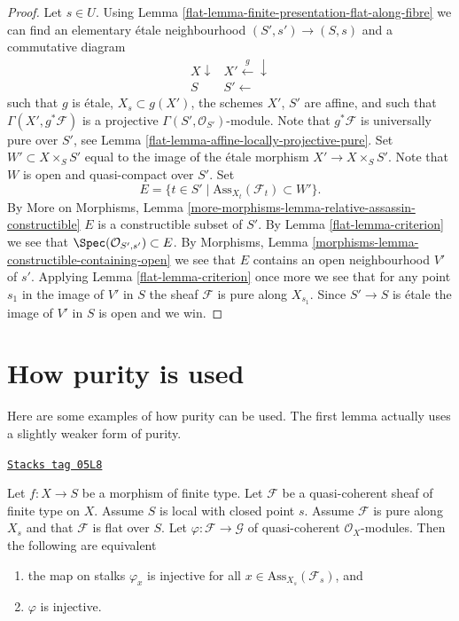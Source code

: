 \begin{proof}

Let $s \in U$. Using
Lemma \ref{flat-lemma-finite-presentation-flat-along-fibre}
we can find an elementary \'etale neighbourhood
$(S', s') \to (S, s)$ and a commutative diagram
$$
\begin{array}{cc}X \downarrow & X' \overset{g}{\longleftarrow}\downarrow \\ S & S' \longleftarrow\end{array}
$$
such that $g$ is \'etale, $X_s \subset g(X')$, the schemes
$X'$, $S'$ are affine, and such that $\Gamma(X', g^*\mathcal{F})$
is a projective $\Gamma(S', \mathcal{O}_{S'})$-module.
Note that $g^*\mathcal{F}$ is universally pure over $S'$, see
Lemma \ref{flat-lemma-affine-locally-projective-pure}.
Set $W' \subset X \times_S S'$ equal to the image of the \'etale morphism
$X' \to X \times_S S'$. Note that $W$ is open and quasi-compact over
$S'$. Set
$$
E = \{t \in S' \mid \text{Ass}_{X_t}(\mathcal{F}_t) \subset W' \}.
$$
By
More on Morphisms,
Lemma \ref{more-morphisms-lemma-relative-assassin-constructible}
$E$ is a constructible subset of $S'$. By
Lemma \ref{flat-lemma-criterion}
we see that $\Spec(\mathcal{O}_{S', s'}) \subset E$.
By
Morphisms, Lemma \ref{morphisms-lemma-constructible-containing-open}
we see that $E$ contains an open neighbourhood $V'$ of $s'$.
Applying
Lemma \ref{flat-lemma-criterion}
once more we see that for any point $s_1$ in the image of $V'$ in $S$
the sheaf $\mathcal{F}$ is pure along $X_{s_1}$. Since
$S' \to S$ is \'etale the image of $V'$ in $S$ is open and we win.
\end{proof}

\section{How purity is used}
\label{flat-section-applications-purity}
Here are some examples of how purity can be used. The first lemma
actually uses a slightly weaker form of purity.

\begin{lemma}
\label{flat-lemma-injectivity-map-source-flat-pure}
\href{https://stacks.math.columbia.edu/tag/05L8}{\texttt{Stacks tag 05L8}}

Let $f : X \to S$ be a morphism of finite type.
Let $\mathcal{F}$ be a quasi-coherent sheaf of finite type on $X$.
Assume $S$ is local with closed point $s$.
Assume $\mathcal{F}$ is pure along $X_s$ and
that $\mathcal{F}$ is flat over $S$.
Let $\varphi : \mathcal{F} \to \mathcal{G}$ of quasi-coherent
$\mathcal{O}_X$-modules. Then the following are equivalent
\begin{enumerate}
\item the map on stalks $\varphi_x$ is injective for all
$x \in \text{Ass}_{X_s}(\mathcal{F}_s)$, and
\item $\varphi$ is injective.
\end{enumerate}
\end{lemma}


